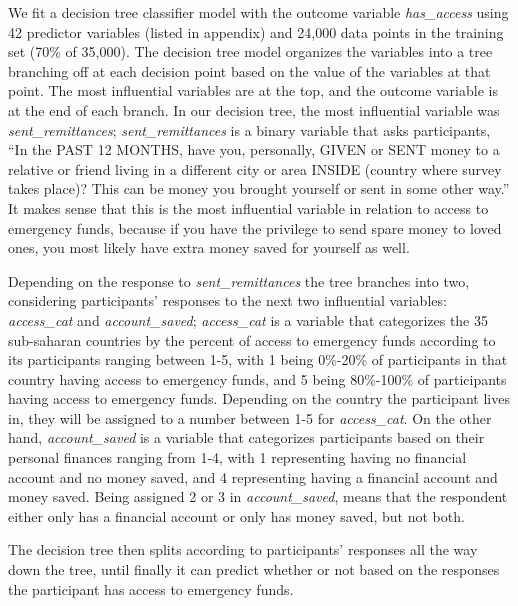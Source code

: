\documentclass[water,article,submit,moreauthors,pdftex]{mdpi}
\begin{document}
We fit a decision tree classifier model with the outcome variable
\emph{has\_access} using 42 predictor variables (listed in appendix) and
24,000 data points in the training set (70\% of 35,000). The decision
tree model organizes the variables into a tree branching off at each
decision point based on the value of the variables at that point. The
most influential variables are at the top, and the outcome variable is
at the end of each branch. In our decision tree, the most influential
variable was \emph{sent\_remittances}; \emph{sent\_remittances} is a
binary variable that asks participants, ``In the PAST 12 MONTHS, have
you, personally, GIVEN or SENT money to a relative or friend living in a
different city or area INSIDE (country where survey takes place)? This
can be money you brought yourself or sent in some other way.'' It makes
sense that this is the most influential variable in relation to access
to emergency funds, because if you have the privilege to send spare
money to loved ones, you most likely have extra money saved for yourself
as well.

Depending on the response to \emph{sent\_remittances} the tree branches
into two, considering participants' responses to the next two
influential variables: \emph{access\_cat} and \emph{account\_saved};
\emph{access\_cat} is a variable that categorizes the 35 sub-saharan
countries by the percent of access to emergency funds according to its
participants ranging between 1-5, with 1 being 0\%-20\% of participants
in that country having access to emergency funds, and 5 being 80\%-100\%
of participants having access to emergency funds. Depending on the
country the participant lives in, they will be assigned to a number
between 1-5 for \emph{access\_cat}. On the other hand,
\emph{account\_saved} is a variable that categorizes participants based
on their personal finances ranging from 1-4, with 1 representing having
no financial account and no money saved, and 4 representing having a
financial account and money saved. Being assigned 2 or 3 in
\emph{account\_saved}, means that the respondent either only has a
financial account or only has money saved, but not both.

The decision tree then splits according to participants' responses all
the way down the tree, until finally it can predict whether or not based
on the responses the participant has access to emergency funds.
\end{document}
